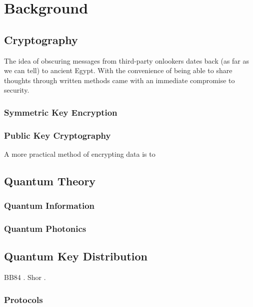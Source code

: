 %
%
\let\textcircled=\pgftextcircled
\chapter{Background}
\label{chap:background}

\section{Cryptography}
\label{sec1:crypto}

The idea of obscuring messages from third-party onlookers dates back (as far as we can tell) to ancient Egypt. With the convenience of being able to share thoughts through written methods came with an immediate compromise to security.

\subsection{Symmetric Key Encryption}

\subsection{Public Key Cryptography}

A more practical method of encrypting data is to 

\section{Quantum Theory}

\subsection{Quantum Information}

\subsection{Quantum Photonics}

\section{Quantum Key Distribution}

BB84 \cite{BB84}. Shor \cite{shor1994}.

\subsection{Protocols}

